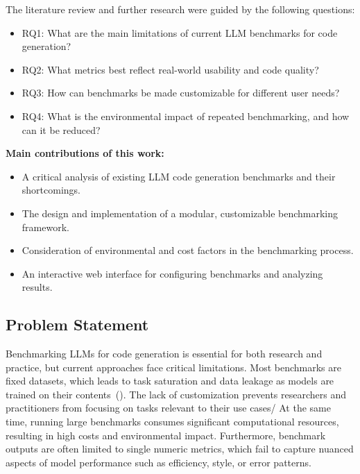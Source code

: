 The literature review and further research were guided by the following questions:
\begin{itemize}
    \item RQ1: What are the main limitations of current LLM benchmarks for code generation?
    \item RQ2: What metrics best reflect real-world usability and code quality?
    \item RQ3: How can benchmarks be made customizable for different user needs?
    \item RQ4: What is the environmental impact of repeated benchmarking, and how can it be reduced?
\end{itemize}

\textbf{Main contributions of this work:}
\begin{itemize}
    \item A critical analysis of existing LLM code generation benchmarks and their shortcomings.
    \item The design and implementation of a modular, customizable benchmarking framework.
    \item Consideration of environmental and cost factors in the benchmarking process.
    \item An interactive web interface for configuring benchmarks and analyzing results.
\end{itemize}

\subsection{Problem Statement}

Benchmarking LLMs for code generation is essential for both research and practice, but current approaches face critical limitations.
Most benchmarks are fixed datasets, which leads to task saturation and data leakage as models are trained on their contents~(\cite{paul2024benchmarksmetricsevaluationscode}).
The lack of customization prevents researchers and practitioners from focusing on tasks relevant to their use cases/ %
At the same time, running large benchmarks consumes significant computational resources, resulting in high costs and environmental impact.
Furthermore, benchmark outputs are often limited to single numeric metrics, which fail to capture nuanced aspects of model performance such as efficiency, style, or error patterns.

